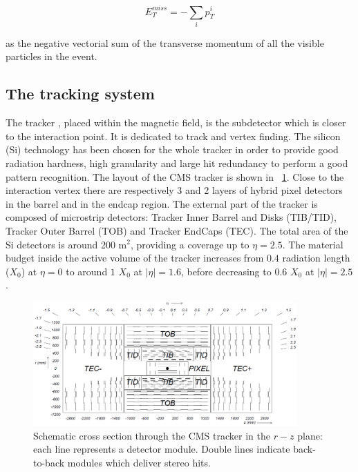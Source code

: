 \begin{equation}
E_T^{miss} = - \sum_i p_T^i
\end{equation}

as the negative vectorial sum of the transverse momentum of all the visible particles in the event.




\subsection{The tracking system}
\label{sec:tracker}
The tracker \cite{Tracker_1, Tracker_2}, placed within the magnetic field, is the subdetector which is closer to the interaction point. It is dedicated to track and vertex finding. The silicon (Si) technology has been chosen for the whole tracker in order to provide good radiation hardness, high granularity and large hit redundancy to perform a good pattern recognition. The layout of the CMS tracker is shown in \figurename~\ref{tracking_system}. Close to the interaction vertex there are respectively 3 and 2 layers of hybrid pixel detectors in the barrel and in the endcap region. The external part of the tracker is composed of microstrip detectors: Tracker Inner Barrel and Disks (TIB/TID), Tracker Outer Barrel (TOB) and Tracker EndCaps (TEC).  The total area of the Si detectors is around 200 m$^2$, providing a coverage up to $\eta = 2.5$. The material budget inside the active volume of the tracker increases from $0.4$ radiation length ($X_0$) at $\eta= 0$ to around $1$  $X_0$ at $|\eta|= 1.6$, before decreasing to $0.6$ $X_0$ at $|\eta|= 2.5$. \\
\begin{figure}[h!]
 \centering
 \includegraphics[width=0.9\textwidth]{Images/cmsTracker_TrackerLayout}
\caption{Schematic cross section through the CMS tracker in the $r-z$ plane: each line represents a detector module. Double lines indicate back-to-back modules which deliver stereo hits.}
\label{tracking_system}
\end{figure}


